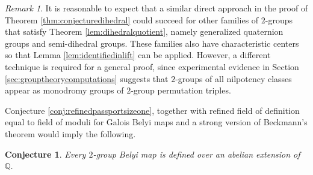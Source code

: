 \documentclass{dcthesis}
\newcommand{\QQ}{\mathbb Q}
\newcommand{\mm}[1]{{\color{blue} \sf MM: [#1]}}
\newcommand{\wt}[1]{\widetilde{#1}}
\DeclareMathOperator{\charpoly}{charpoly}
\DeclareMathOperator{\Tr}{tr}
\numberwithin{equation}{section}
\newtheorem{conj}[equation]{Conjecture}
\theoremstyle{definition}
\theoremstyle{remark}
\newtheorem{remark}[equation]{Remark}
\begin{document}
{{{      %
    \begin{remark}
      \label{rmk:othermaxnilpotency}
      It is reasonable to expect that a similar
      direct approach in the proof of
      Theorem \ref{thm:conjecturedihedral}
      could succeed for other families
      of $2$-groups that satisfy
      Theorem
      \ref{lem:dihedralquotient},
      namely generalized quaternion groups
      and semi-dihedral groups.
      These families also have characteristic
      centers so that
      Lemma
      \ref{lem:identifiedinlift}
      can be applied.
      However,
      a different technique is required for a
      general proof,
      since experimental evidence in
      Section
      \ref{sec:grouptheorycomputations}
      suggests that $2$-groups
      of all nilpotency classes
      appear as monodromy groups
      of $2$-group permutation triples.
    \end{remark}
    Conjecture \ref{conj:refinedpassportsizeone},
    together with refined field of definition
    equal to field of moduli for
    Galois Belyi maps
    and a strong version of
    Beckmann's theorem would imply the following.
    \begin{conj}
      \label{conj:fieldofdefinitionofbelyimap}
      Every $2$-group Belyi map is
      defined over an abelian extension of $\QQ$.
    \end{conj}
  }
}}
\end{document}
